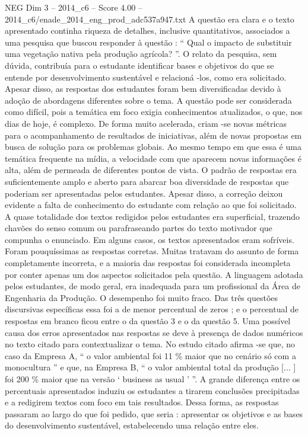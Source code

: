 \begin{textsample}{NEG Dim 3 – 2014\_c6 – Score 4.00 – 2014\_c6/enade\_2014\_eng\_prod\_adc537a947.txt}
A questão era clara e o texto apresentado continha riqueza de detalhes, inclusive quantitativos, associados a uma pesquisa que buscou responder à questão : “ Qual o impacto de substituir uma vegetação nativa pela produção agrícola? ”.
O relato da pesquisa, sem dúvida, contribuía para o estudante identificar bases e objetivos do que se entende por desenvolvimento sustentável e relacioná -los, como era solicitado.
Apesar disso, as respostas dos estudantes foram bem diversificadas devido à adoção de abordagens diferentes sobre o tema.
A questão pode ser considerada como difícil, pois a temática em foco exigia conhecimentos atualizados, o que, nos dias de hoje, é complexo.
De forma muito acelerada, criam -se novas métricas para o acompanhamento de resultados de iniciativas, além de novas propostas em busca de solução para os problemas globais.
Ao mesmo tempo em que essa é uma temática frequente na mídia, a velocidade com que aparecem novas informações é alta, além de permeada de diferentes pontos de vista.
O padrão de respostas era suficientemente amplo e aberto para abarcar boa diversidade de respostas que poderiam ser apresentadas pelos estudantes.
Apesar disso, a correção deixou evidente a falta de conhecimento do estudante com relação ao que foi solicitado.
A quase totalidade dos textos redigidos pelos estudantes era superficial, trazendo chavões do senso comum ou parafraseando partes do texto motivador que compunha o enunciado.
Em alguns casos, os textos apresentados eram sofríveis.
Foram pouquíssimas as respostas corretas.
Muitas tratavam do assunto de forma completamente incorreta, e a maioria das respostas foi considerada incompleta por conter apenas um dos aspectos solicitados pela questão.
A linguagem adotada pelos estudantes, de modo geral, era inadequada para um profissional da Área de Engenharia da Produção.
O desempenho foi muito fraco.
Das três questões discursivas específicas essa foi a de menor percentual de zeros ; e o percentual de respostas em branco ficou entre o da questão 3 e o da questão 5.
Uma possível causa dos erros apresentados nas respostas se deve à presença de dados numéricos no texto citado para contextualizar o tema.
No estudo citado afirma -se que, no caso da Empresa A, “ o valor ambiental foi 11 \% maior que no cenário só com a monocultura ” e que, na Empresa B, “ o valor ambiental total da produção [... ] foi 200 \% maior que na versão ‘ business as usual ’ ”.
A grande diferença entre os percentuais apresentados induziu os estudantes a tirarem conclusões precipitadas e a redigirem textos com foco em tais resultados.
Dessa forma, as respostas passaram ao largo do que foi pedido, que seria : apresentar os objetivos e as bases do desenvolvimento sustentável, estabelecendo uma relação entre eles.

\end{textsample}
